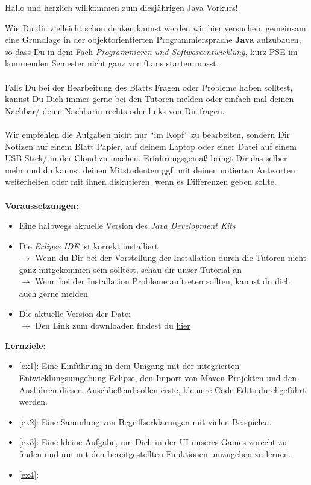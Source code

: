 

\begin{center}
	Hallo und herzlich willkommen zum diesjährigen Java Vorkurs!\\
\end{center}
Wie Du dir vielleicht schon denken kannst werden wir hier versuchen, gemeinsam eine Grundlage in der objektorientierten Programmiersprache \textbf{Java} aufzubauen, so dass Du in dem Fach \textit{Programmieren und Softwareentwicklung}, kurz PSE im kommenden Semester nicht ganz von 0 aus starten musst.\\\\
Falls Du bei der Bearbeitung des Blatts Fragen oder Probleme haben solltest, kannst Du Dich immer gerne bei den Tutoren melden oder einfach mal deinen Nachbar/ deine Nachbarin rechts oder links von Dir fragen.\\\\
Wir empfehlen die Aufgaben nicht nur \enquote{im Kopf} zu bearbeiten, sondern Dir Notizen auf einem Blatt Papier, auf deinem Laptop oder einer Datei auf einem USB-Stick/ in der Cloud zu machen. Erfahrungsgemäß bringt Dir das selber mehr und du kannst deinen Mitstudenten ggf. mit deinen notierten Antworten weiterhelfen oder mit ihnen diskutieren, wenn es Differenzen geben sollte.\\\\
\textbf{Voraussetzungen:}
\begin{itemize}
	\item Eine halbwegs aktuelle Version des \textit{Java Development Kits}
	\item Die \textit{Eclipse IDE} ist korrekt installiert\\
	$\rightarrow$ Wenn du Dir bei der Vorstellung der Installation durch die Tutoren nicht ganz mitgekommen sein solltest, schau dir unser \href{https://youtu.be/zxH3G1MTrVs}{Tutorial} an\\
	$\rightarrow$ Wenn bei der Installation Probleme auftreten sollten, kannst du dich auch gerne melden
	\item Die aktuelle Version der \texttt{\jvkpackage} Datei\\
	$\rightarrow$ Den Link zum downloaden findest du \href{\jvkpackageurl}{hier}
\end{itemize}
\textbf{Lernziele:}
\begin{itemize}
	\item \ref{ex1}: Eine Einführung in dem Umgang mit der integrierten Entwicklungsumgebung Eclipse, den Import von Maven Projekten und den Ausführen dieser. Anschließend sollen erste, kleinere Code-Edits durchgeführt werden.
	\item \ref{ex2}: Eine Sammlung von Begriffserklärungen mit vielen Beispielen.
	\item \ref{ex3}: Eine kleine Aufgabe, um Dich in der UI unseres Games zurecht zu finden und um mit den bereitgestellten Funktionen umzugehen zu lernen.
	\item \ref{ex4}:
\end{itemize}